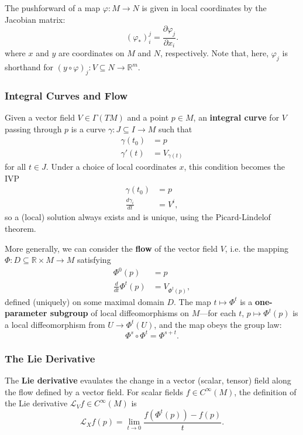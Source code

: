 \documentclass[reqno]{amsart}
\numberwithin{equation}{section}
\begin{document}
The pushforward of a map $\varphi : M \to N$ is given in local coordinates by the Jacobian matrix:
$$
    (\varphi_*)_i^j = \frac{\partial \varphi_j}{\partial x_i}.
$$
where $x$ and $y$ are coordinates on $M$ and $N$, respectively.
Note that, here, $\varphi_j$ is shorthand for $(y \circ \varphi)_j : V \subseteq N \to \mathbb R^m$.

\subsubsection{Integral Curves and Flow}

Given a vector field $V \in \Gamma(TM)$ and a point $p \in M$, an \textbf{integral curve} for $V$ passing through $p$
is a curve $\gamma : J \subseteq I \to M$ such that
\begin{align*}
    \gamma(t_0) &= p \\
    \gamma'(t) &= V_{\gamma(t)}
\end{align*}
for all $t \in J$. Under a choice of local coordinates $x$, this condition becomes the IVP
\begin{align*}
    \gamma(t_0) &= p \\
    \frac{d \gamma_i}{dt} &= V^i,
\end{align*}
so a (local) solution always exists and is unique,
using the Picard-Lindelof theorem.

More generally, we can consider the \textbf{flow} of the vector field $V$, i.e. the mapping
$\Phi : D \subseteq \mathbb R \times M \to M$ satisfying
\begin{align*}
    \Phi^0(p) &= p \\
    \frac{d}{dt} \Phi^t(p) &= V_{\Phi^t(p)},
\end{align*}
defined (uniquely) on some maximal domain $D$. The map $t \mapsto \Phi^t$ is a
\textbf{one-parameter subgroup} of local diffeomorphisms on $M$---for each $t$, $p \mapsto \Phi^t(p)$
is a local diffeomorphism from $U \to \Phi^t(U)$, and the map obeys the group law:
$$
    \Phi^s \circ \Phi^t = \Phi^{s+t}.
$$

\subsubsection{The Lie Derivative}

The \textbf{Lie derivative} evaulates the change in a vector (scalar, tensor) field along the flow defined
by a vector field. For scalar fields $f \in C^{\infty}(M)$, the definition of the Lie derivative $\mathcal L_Vf \in
C^{\infty}(M)$ is
$$
\mathcal L_X f(p) = \lim_{t \to 0} \frac{f(\Phi^t(p)) - f(p)}{t}.
$$
\end{document}
